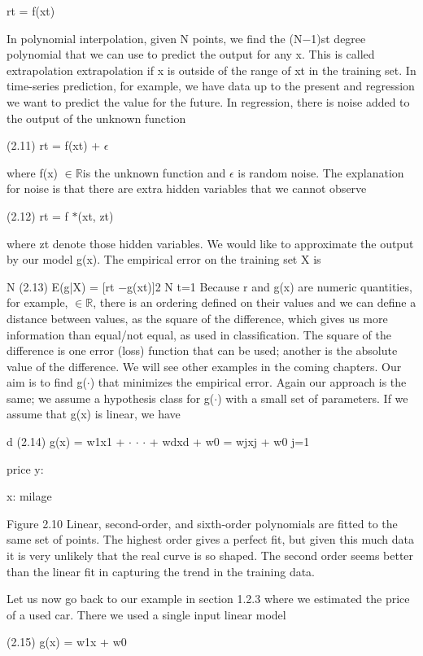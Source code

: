 rt = f(xt)

In polynomial interpolation, given N points, we find the (N$-$1)st degree polynomial that we can use to predict the output for any x. This is called extrapolation extrapolation if x is outside of the range of xt in the training set. In time-series prediction, for example, we have data up to the present and regression we want to predict the value for the future. In regression, there is noise added to the output of the unknown function

(2.11) rt = f(xt) + $\epsilon$

where f(x) $\in$$\mathbb{R}$is the unknown function and $\epsilon$ is random noise. The explanation for noise is that there are extra hidden variables that we cannot observe

(2.12) rt = f $*$(xt, zt)

where zt denote those hidden variables. We would like to approximate the output by our model g(x). The empirical error on the training set X is

N (2.13) E(g|X) = [rt $-$g(xt)]2 N t=1 Because r and g(x) are numeric quantities, for example, $\in$$\mathbb{R}$, there is an ordering defined on their values and we can define a distance between values, as the square of the difference, which gives us more information than equal/not equal, as used in classification. The square of the difference is one error (loss) function that can be used; another is the absolute value of the difference. We will see other examples in the coming chapters. Our aim is to find g($\cdot$) that minimizes the empirical error. Again our approach is the same; we assume a hypothesis class for g($\cdot$) with a small set of parameters. If we assume that g(x) is linear, we have

d (2.14) g(x) = w1x1 + $\cdot$ $\cdot$ $\cdot$ + wdxd + w0 = wjxj + w0 j=1

price y:

x: milage

Figure 2.10 Linear, second-order, and sixth-order polynomials are fitted to the same set of points. The highest order gives a perfect fit, but given this much data it is very unlikely that the real curve is so shaped. The second order seems better than the linear fit in capturing the trend in the training data.

Let us now go back to our example in section 1.2.3 where we estimated the price of a used car. There we used a single input linear model

(2.15) g(x) = w1x + w0

